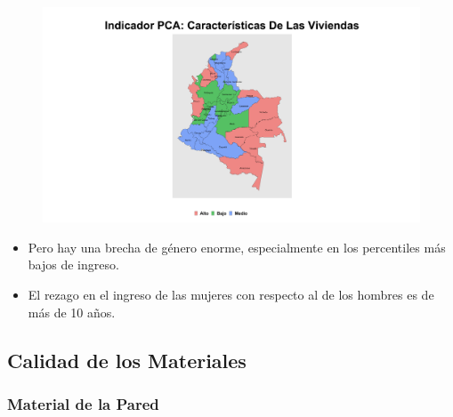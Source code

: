 \begin{figure}[H]
        \caption[Indicador Pulso Social sobre Características de la Vivienda (PCA)]{\label{pca_pobreza} }
        \begin{center}
        \includegraphics[width=\textwidth,keepaspectratio]{pca_clusters/pca_caracteristicas_de_las_viviendas_pca.png}
        \end{center}
    \end{figure}

    \begin{tcolorbox}[enhanced, colback=mycolor,colframe=mycolor,drop fuzzy shadow,watermark color=white,
                        title=Principales Resultados]
    
                    \begin{itemize}
                    \item Pero hay una brecha de género enorme, especialmente en los percentiles más bajos de ingreso.
                    \item El rezago en el ingreso de las mujeres con respecto al de los hombres es de más de 10 años.
                \end{itemize}
     
    \end{tcolorbox}
    
    
    \subsection{Calidad de los Materiales}
        \subsubsection{Material de la Pared}

